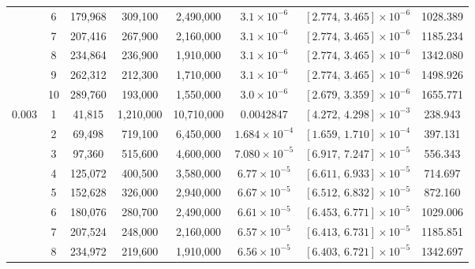\begin{longtable}{c|c|c|c|c|c|c|c}
& 6 & 179,968 & 309,100 & 2,490,000
& \(3.1\times10^{-6}\)
& \(\left[2.774,\,3.465\right]\times10^{-6}\)
& 1028.389 \\ \cline{2-8}

& 7 & 207,416 & 267,900 & 2,160,000
& \(3.1\times10^{-6}\)
& \(\left[2.774,\,3.465\right]\times10^{-6}\)
& 1185.234 \\ \cline{2-8}

& 8 & 234,864 & 236,900 & 1,910,000
& \(3.1\times10^{-6}\)
& \(\left[2.774,\,3.465\right]\times10^{-6}\)
& 1342.080 \\ \cline{2-8}

& 9 & 262,312 & 212,300 & 1,710,000
& \(3.1\times10^{-6}\)
& \(\left[2.774,\,3.465\right]\times10^{-6}\)
& 1498.926 \\ \cline{2-8}

& 10 & 289,760 & 193,000 & 1,550,000
& \(3.0\times10^{-6}\)
& \(\left[2.679,\,3.359\right]\times10^{-6}\)
& 1655.771 \\
\hline

\multirow{10}{*}{0.003}
& 1 & 41,815 & 1,210,000 & 10,710,000
& 0.0042847
& \(\left[4.272,\,4.298\right]\times10^{-3}\)
& 238.943 \\ \cline{2-8}

& 2 & 69,498 & 719,100 & 6,450,000
& \(1.684\times10^{-4}\)
& \(\left[1.659,\,1.710\right]\times10^{-4}\)
& 397.131 \\ \cline{2-8}

& 3 & 97,360 & 515,600 & 4,600,000
& \(7.080\times10^{-5}\)
& \(\left[6.917,\,7.247\right]\times10^{-5}\)
& 556.343 \\ \cline{2-8}

& 4 & 125,072 & 400,500 & 3,580,000
& \(6.77\times10^{-5}\)
& \(\left[6.611,\,6.933\right]\times10^{-5}\)
& 714.697 \\ \cline{2-8}

& 5 & 152,628 & 326,000 & 2,940,000
& \(6.67\times10^{-5}\)
& \(\left[6.512,\,6.832\right]\times10^{-5}\)
& 872.160 \\ \cline{2-8}

& 6 & 180,076 & 280,700 & 2,490,000
& \(6.61\times10^{-5}\)
& \(\left[6.453,\,6.771\right]\times10^{-5}\)
& 1029.006 \\ \cline{2-8}

& 7 & 207,524 & 248,000 & 2,160,000
& \(6.57\times10^{-5}\)
& \(\left[6.413,\,6.731\right]\times10^{-5}\)
& 1185.851 \\ \cline{2-8}

& 8 & 234,972 & 219,600 & 1,910,000
& \(6.56\times10^{-5}\)
& \(\left[6.403,\,6.721\right]\times10^{-5}\)
& 1342.697 \\ \cline{2-8}


\end{longtable}
